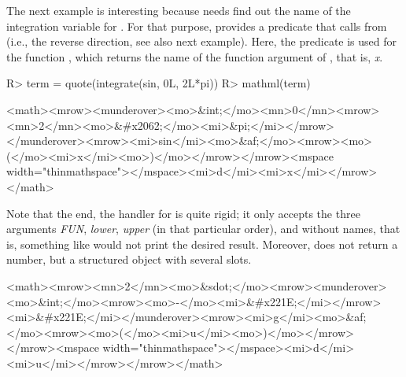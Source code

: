 \documentclass[article]{jss}
\begin{document}
The next example is interesting because  needs find out the
name of the integration variable for . For that purpose, 
provides a predicate  that calls  
from  (i.e., the reverse direction, see also next example).
Here, the predicate is used for the  
function , which returns the name of the function
argument of , that is, \emph{x}.

\begin{Schunk}
\begin{Sinput}
R> term = quote(integrate(sin, 0L, 2L*pi))
R> mathml(term)
\end{Sinput}
\begin{Soutput}
<math><mrow><munderover><mo>&int;</mo><mn>0</mn><mrow><mn>2</mn><mo>&#x2062;</mo><mi>&pi;</mi></mrow></munderover><mrow><mi>sin</mi><mo>&af;</mo><mrow><mo>(</mo><mi>x</mi><mo>)</mo></mrow></mrow><mspace width="thinmathspace"></mspace><mi>d</mi><mi>x</mi></mrow></math> 
\end{Soutput}
\end{Schunk}

Note that the  end, the handler for  is
quite rigid; it only accepts the three
arguments \emph{FUN}, \emph{lower}, \emph{upper} (in that particular order), and
without names, that is, 
something like  would not print
the desired result. Moreover,  does not return a number, but a
structured object with several slots.

\begin{Schunk}
\begin{Soutput}
<math><mrow><mn>2</mn><mo>&sdot;</mo><mrow><munderover><mo>&int;</mo><mrow><mo>-</mo><mi>&#x221E;</mi></mrow><mi>&#x221E;</mi></munderover><mrow><mi>g</mi><mo>&af;</mo><mrow><mo>(</mo><mi>u</mi><mo>)</mo></mrow></mrow><mspace width="thinmathspace"></mspace><mi>d</mi><mi>u</mi></mrow></mrow></math> 
\end{Soutput}
\end{Schunk}
\end{document}
